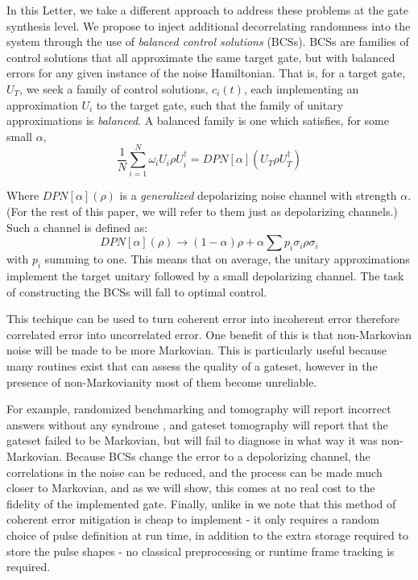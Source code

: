 \documentclass[aps,nofootinbib,pra,notitlepage,twocolumn]{revtex4-1}
\begin{document}
In this Letter, we take a different approach to address these problems at the gate synthesis level. We propose to inject additional decorrelating randomness into the system through the use of \emph{balanced control solutions} (BCSs). BCSs are families of control solutions that all approximate the same target gate, but with balanced errors for any given instance of the noise Hamiltonian. That is, for a target gate, $U_T$, we seek a family of control solutions, $c_i(t)$, each implementing an approximation $U_i$ to the target gate, such that the family of unitary approximations is \emph{balanced}. A balanced family is one which satisfies, for some small $\alpha$,
\begin{equation}\label{eq:1}
  \frac{1}{N}\sum_{i=1}^N \omega_i U_i \rho U_i^\dagger = DPN[\alpha]\left(U_T \rho U_T^\dagger \right)
\end{equation}

Where $DPN[\alpha](\rho)$ is a \textit{generalized} depolarizing noise channel with strength $\alpha$. (For the rest of this paper, we will refer to them just as depolarizing channels.) Such a channel is defined as:
\begin{equation}\label{eq:2}
  DPN[\alpha](\rho) \rightarrow (1-\alpha)\rho + \alpha\sum p_i \sigma_i\rho\sigma_i
\end{equation}
with $p_i$ summing to one. This means that on average, the unitary approximations implement the target unitary followed by a small depolarizing channel. The task of constructing the BCSs will fall to optimal control.

This techique can be used to turn coherent error into incoherent error therefore correlated error into uncorrelated error. One benefit of this is that non-Markovian noise will be made to be more Markovian. This is particularly useful because many routines exist that can assess the quality of a gateset, however in the presence of non-Markovianity most of them become unreliable.

For example, randomized benchmarking and tomography will report incorrect answers without any syndrome \cite{Merkel2013}, and gateset tomography will report that the gateset failed to be Markovian, but will fail to diagnose in what way it was non-Markovian. Because BCSs change the error to a depolorizing channel, the correlations in the noise can be reduced, and the process can be made much closer to Markovian, and as we will show, this comes at no real cost to the fidelity of the implemented gate. Finally, unlike in \cite{Wallman2016, Campbell2017, Ware2018} we note that this method of coherent error mitigation is cheap to implement - it only requires a random choice of pulse definition at run time, in addition to the extra storage required to store the pulse shapes - no classical preprocessing or runtime frame tracking is required.
\end{document}
